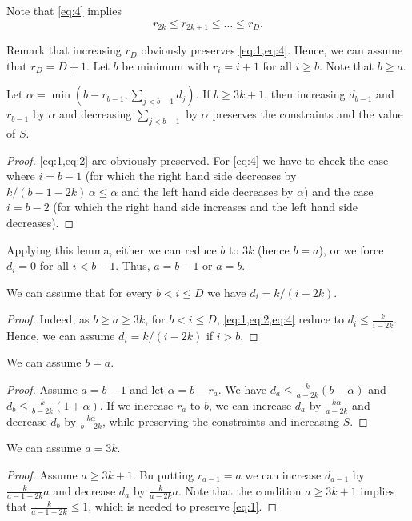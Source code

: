 
Note that \cref{eq:4} implies 
\begin{equation}
	r_{2k}\le r_{2k+1}\le \dots\le r_D.
\end{equation}

Remark that increasing $r_D$ obviously preserves \cref{eq:1,eq:4}. Hence, we can assume that $r_D=D+1$.
Let $b$ be minimum with $r_{i}=i+1$ for all $i\geq b$. Note that $b\ge a$.


\begin{lemma}
	Let $\alpha=\min(b-r_{b-1},\sum_{j<b-1}d_j)$.
If $b\ge 3k+1$, then increasing  $d_{b-1}$ and $r_{b-1}$ by $\alpha$ and decreasing 
$\sum_{j<b-1}$ by $\alpha$ preserves the constraints and the value of $S$.
\end{lemma}
\begin{proof}
	\cref{eq:1,eq:2} are obviously preserved. For \cref{eq:4} we have to check the case where $i=b-1$ (for which the right hand side decreases by $k/(b-1-2k)\,\alpha\le\alpha$ and the left hand side decreases by $\alpha$) and the case $i=b-2$  (for which the right hand side increases and the left hand side decreases).
\end{proof}
Applying this lemma, either we can reduce $b$ to $3k$ (hence $b=a$), or we force $d_i=0$ for all $i<b-1$. Thus, $a=b-1$ or $a=b$.

\begin{lemma}
	We can assume that for every $b< i\le D$ we have  $d_i=k/(i-2k)$.
\end{lemma}
\begin{proof}
Indeed, as $b\ge a\ge 3k$, for $b< i\le D$,  \cref{eq:1,eq:2,eq:4} reduce to 
$d_{i}\le \frac{k}{i-2k}$. Hence, we can assume $d_i=k/(i-2k)$ if $i> b$.
\end{proof}

\begin{lemma}
	We can assume $b=a$. 
\end{lemma}
\begin{proof}
	Assume $a=b-1$ and let $\alpha=b-r_a$.
	We have $d_a\le\frac{k}{a-2k} (b-\alpha)$ and $d_b\le \frac{k}{b-2k} (1+\alpha)$.
	If we increase $r_a$ to $b$, we can increase $d_a$ by $\frac{k\alpha}{a-2k}$ and decrease
	$d_b$ by  $\frac{k\alpha}{b-2k}$, while preserving the constraints and increasing $S$.
\end{proof}

\begin{lemma}
	We can assume $a=3k$.
\end{lemma}
\begin{proof}
Assume $a\ge 3k+1$. Bu putting $r_{a-1}=a$ we can increase $d_{a-1}$ by $\frac{k}{a-1-2k}a$ and decrease $d_a$ by  $\frac{k}{a-2k}a$. Note that the condition $a\ge 3k+1$ implies that 
$\frac{k}{a-1-2k}\le 1$, which is needed to preserve \cref{eq:1}.
\end{proof}

